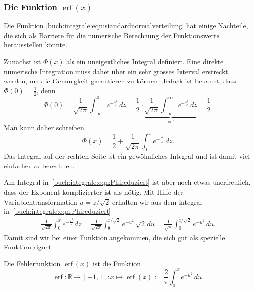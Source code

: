 \subsubsection{Die Funktion $\operatorname{erf}(x)$}
Die Funktion \eqref{buch:integrale:eqn:standardnormalverteilung} hat
einige Nachteile, die sich als Barriere für die numerische 
Berechnung der Funktionswerte herausstellen könnte.

Zunächst ist $\Phi(x)$ als ein uneigentliches Integral definiert.
Eine direkte numerische Integration muss daher über ein sehr grosses
Interval erstreckt werden, um die Genauigkeit garantieren zu können.
Jedoch ist bekannt, dass $\Phi(0)=\frac12$, denn
\[
\Phi(0)
=
\frac{1}{\sqrt{2\pi}}
\int_{-\infty}^0 e^{-\frac{z^2}2}\,dz
=
\frac12\cdot\underbrace{\frac{1}{\sqrt{2\pi}}
\int_{-\infty}^{\infty} e^{-\frac{z^2}2}\,dz}_{\displaystyle=1}
=
\frac12.
\]
Man kann daher schreiben
\begin{equation}
\Phi(x) = \frac12 + \frac{1}{\sqrt{2\pi}}\int_0^x e^{-\frac{z^2}{z}}\,dz.
\label{buch:integrale:eqn:Phireduziert}
\end{equation}
Das Integral auf der rechten Seite ist ein gewöhnliches Integral und ist
damit viel einfacher zu berechnen.

Am Integral in~\eqref{buch:integrale:eqn:Phireduziert} ist aber noch etwas
unerfreulich, dass der Exponent komplizierter ist als nötig.
Mit Hilfe der Variablentransformation $u = z/\sqrt{2}$ erhalten wir
aus dem Integral in~\eqref{buch:integrale:eqn:Phireduziert}
\begin{align*}
\frac{1}{\sqrt{2\pi}}
\int_0^x e^{-\frac{z^2}2}\,dz
=
\frac{1}{\sqrt{2\pi}}
\int_0^{x/\sqrt{2}}
e^{-u^2} \, \sqrt{2}\,du
=
\frac{1}{\sqrt{\pi}}
\int_0^{x/\sqrt{2}}
e^{-u^2} \,du.
\end{align*}
Damit sind wir bei einer Funktion angekommen, die sich gut als spezielle
Funktion eignet.

\begin{definition}
Die Fehlerfunktion $\operatorname{erf}(x)$ ist die Funktion
%
%
\[
\operatorname{erf}
\colon
\mathbb{R}\to [-1,1]
:
x
\mapsto
\operatorname{erf}(x)
:=
\frac{2}{\pi}
\int_0^x e^{-u^2}\,du.
\]
\end{definition}

